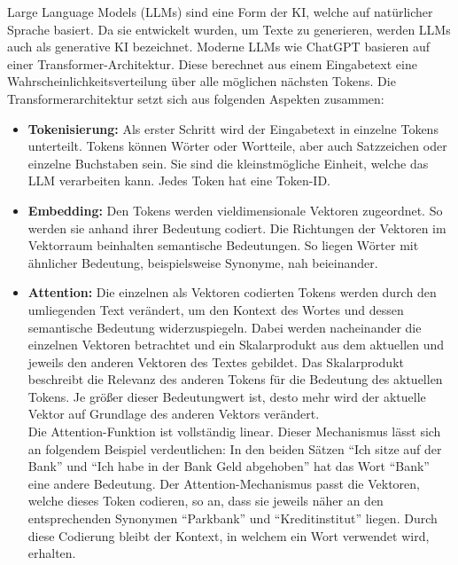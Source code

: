\documentclass[../main.tex]{subfiles}
\begin{document}
Large Language Models (LLMs) sind eine Form der KI, welche auf natürlicher Sprache basiert. Da sie entwickelt wurden, um Texte zu generieren, werden LLMs auch als generative KI bezeichnet.
Moderne LLMs wie ChatGPT basieren auf einer Transformer-Architektur. Diese berechnet aus einem Eingabetext eine Wahrscheinlichkeitsverteilung 
über alle möglichen nächsten Tokens. Die Transformerarchitektur setzt sich aus folgenden Aspekten zusammen:\cite{architecture}\\

\begin{itemize}

\item \textbf{Tokenisierung:} Als erster Schritt wird der Eingabetext in einzelne Tokens unterteilt. Tokens können Wörter oder Wortteile, aber auch Satzzeichen oder einzelne Buchstaben sein. Sie sind die kleinstmögliche Einheit, welche das LLM verarbeiten kann. Jedes Token hat eine Token-ID.\cite{architecture}

\item \textbf{Embedding:} Den Tokens werden vieldimensionale Vektoren zugeordnet. So werden sie anhand ihrer Bedeutung codiert. Die Richtungen der Vektoren im Vektorraum beinhalten semantische Bedeutungen. So liegen Wörter mit ähnlicher Bedeutung, beispielsweise Synonyme, nah beieinander.\cite{embedding}

\item \textbf{Attention:} Die einzelnen als Vektoren codierten Tokens werden durch den umliegenden Text verändert, um den Kontext des Wortes und dessen semantische Bedeutung widerzuspiegeln. Dabei werden nacheinander die einzelnen Vektoren betrachtet und ein Skalarprodukt aus dem aktuellen und jeweils den anderen Vektoren des Textes gebildet. Das Skalarprodukt beschreibt die Relevanz des anderen Tokens für die Bedeutung des aktuellen Tokens. Je größer dieser Bedeutungwert ist, desto mehr wird der aktuelle Vektor auf Grundlage des anderen Vektors verändert.\\
Die Attention-Funktion ist vollständig linear. Dieser Mechanismus lässt sich an folgendem Beispiel verdeutlichen: In den beiden Sätzen “Ich sitze auf der Bank” und “Ich habe in der Bank Geld abgehoben” hat das Wort “Bank” eine andere Bedeutung. Der Attention-Mechanismus passt die Vektoren, welche dieses Token codieren, so an, dass sie jeweils näher an den entsprechenden Synonymen “Parkbank” und “Kreditinstitut” liegen. Durch diese Codierung bleibt der Kontext, in welchem ein Wort verwendet wird, erhalten.\cite{attention, attention2} 


\end{itemize}
\end{document}
